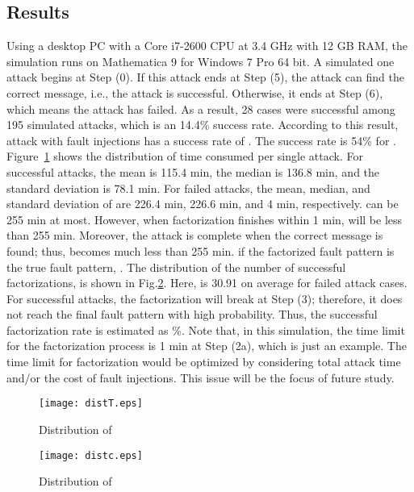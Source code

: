 \documentclass{article}
\begin{document}
\subsection{Results}
Using a desktop PC with a Core i7-2600 CPU at 3.4 GHz with 12 GB RAM, 
the simulation runs on Mathematica 9 for Windows 7 Pro 64 bit. 
A simulated one attack begins 
at Step (0). If this attack ends at Step (5), the attack can find the correct message, i.e., the 
attack is successful. Otherwise, it ends at Step (6), which means the attack has failed. 
As a result, 28 cases were successful among 195 simulated attacks, which is an 14.4\% success rate. 
According to this result, attack with  fault injections has a success rate of . 
The success rate is 54\% for . Figure~\ref{fig:A} shows the distribution of time consumed  per single attack. 
 For successful attacks, 
the mean  is 115.4 min, the median is 136.8 min, and the standard deviation is 78.1 min. For 
failed attacks, the mean, median, and standard deviation of  
are 226.4 min, 226.6 min, and 4 min, respectively.  can be 255 
min at most. However, when factorization finishes within 1 min,  will be less than 255 min. 
Moreover, the attack is complete when the correct message is found; 
thus,  becomes much less than 255 min. if the factorized fault pattern  is 
the true fault pattern, .
 The distribution of the number of successful factorizations,  is shown in Fig.\ref{fig:B}. 
Here,  is 30.91 
on average for failed attack cases. For successful attacks, 
the factorization will break at 
Step (3); therefore, it does not reach the final fault pattern  with high probability. 
Thus, the successful factorization rate is estimated as \%.
Note that, in this simulation, the time limit for the factorization process is 
1 min at Step (2a), which is just an example. The time limit for factorization would be optimized 
by considering total attack time and/or the cost of fault injections. 
This issue will be the focus of future study.


\begin{figure}[htbp]
 \begin{center}
  \texttt{[image: distT.eps]}
 \end{center}
 \caption{Distribution of }
 \label{fig:A}
\end{figure}

\begin{figure}[htbp]
 \begin{center}
  \texttt{[image: distc.eps]}
 \end{center}
 \caption{Distribution of }
 \label{fig:B}
\end{figure}
\end{document}
